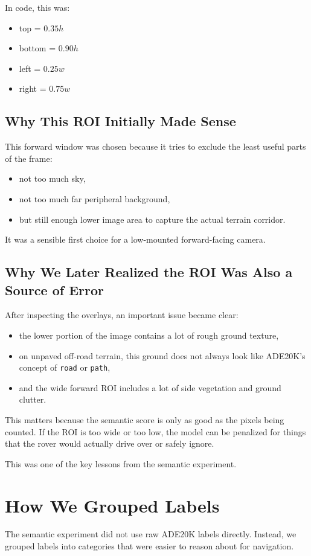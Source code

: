 \documentclass[11pt]{article}
\begin{document}
In code, this was:
\begin{itemize}[leftmargin=*]
\item top = $0.35h$
\item bottom = $0.90h$
\item left = $0.25w$
\item right = $0.75w$
\end{itemize}

\subsection{Why This ROI Initially Made Sense}
This forward window was chosen because it tries to exclude the least useful parts of the frame:
\begin{itemize}[leftmargin=*]
\item not too much sky,
\item not too much far peripheral background,
\item but still enough lower image area to capture the actual terrain corridor.
\end{itemize}

It was a sensible first choice for a low-mounted forward-facing camera.

\subsection{Why We Later Realized the ROI Was Also a Source of Error}
After inspecting the overlays, an important issue became clear:
\begin{itemize}[leftmargin=*]
\item the lower portion of the image contains a lot of rough ground texture,
\item on unpaved off-road terrain, this ground does not always look like ADE20K's concept of \texttt{road} or \texttt{path},
\item and the wide forward ROI includes a lot of side vegetation and ground clutter.
\end{itemize}

This matters because the semantic score is only as good as the pixels being counted. If the ROI is too wide or too low, the model can be penalized for things that the rover would actually drive over or safely ignore.

This was one of the key lessons from the semantic experiment.

\section{How We Grouped Labels}
The semantic experiment did not use raw ADE20K labels directly. Instead, we grouped labels into categories that were easier to reason about for navigation.
\end{document}
